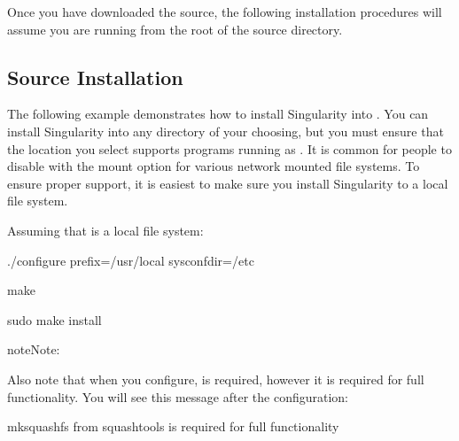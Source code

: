 \documentclass[letterpaper,10pt,english]{sphinxmanual}
\begin{document}
Once you have downloaded the source, the following installation
procedures will assume you are running from the root of the source
directory.


\subsection{Source Installation}
\label{\detokenize{admin_quickstart:source-installation}}
The following example demonstrates how to install Singularity into .
You can install Singularity into any directory of your choosing, but
you must ensure that the location you select supports programs running
as . It is common for people to disable  with the mount option  for
various network mounted file systems. To ensure proper support, it is
easiest to make sure you install Singularity to a local file system.

Assuming that  is a local file system:

%
\begin{sphinxVerbatim}[commandchars=\\\{\}]
\PYGZdl{} ./configure \PYGZhy{}\PYGZhy{}prefix=/usr/local \PYGZhy{}\PYGZhy{}sysconfdir=/etc

\PYGZdl{} make

\PYGZdl{} sudo make install
\end{sphinxVerbatim}

\begin{sphinxadmonition}{note}{Note:}
  
\end{sphinxadmonition}

Also note that when you configure,  is  required, however it is
required for full functionality. You will see this message after the
configuration:

%
\begin{sphinxVerbatim}[commandchars=\\\{\}]
mksquashfs from squash\PYGZhy{}tools is required for full functionality
\end{sphinxVerbatim}
\end{document}
